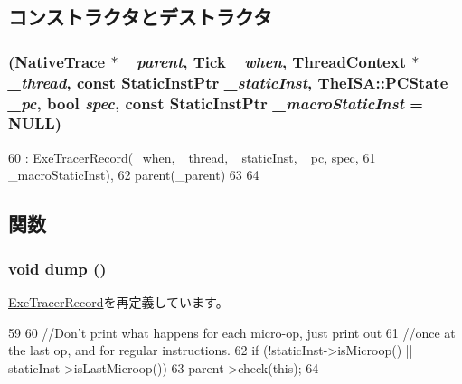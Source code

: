 \subsection{コンストラクタとデストラクタ}
\hypertarget{classTrace_1_1NativeTraceRecord_a93fa63c8fcf1be196cc993939b2c41ff}{
\subsubsection[{NativeTraceRecord}]{ ({\bf NativeTrace} $\ast$ {\em \_\-parent}, \/  {\bf Tick} {\em \_\-when}, \/  {\bf ThreadContext} $\ast$ {\em \_\-thread}, \/  const {\bf StaticInstPtr} {\em \_\-staticInst}, \/  TheISA::PCState {\em \_\-pc}, \/  bool {\em spec}, \/  const {\bf StaticInstPtr} {\em \_\-macroStaticInst} = {\ttfamily NULL})}}
\label{classTrace_1_1NativeTraceRecord_a93fa63c8fcf1be196cc993939b2c41ff}



\begin{DoxyCode}
60         : ExeTracerRecord(_when, _thread, _staticInst, _pc, spec,
61                 _macroStaticInst),
62         parent(_parent)
63     {
64     }
\end{DoxyCode}


\subsection{関数}
\hypertarget{classTrace_1_1NativeTraceRecord_accd2600060dbaee3a3b41aed4034c63c}{
\subsubsection[{dump}]{\setlength{\rightskip}{0pt plus 5cm}void dump ()}}
\label{classTrace_1_1NativeTraceRecord_accd2600060dbaee3a3b41aed4034c63c}


\hyperlink{classTrace_1_1ExeTracerRecord_accd2600060dbaee3a3b41aed4034c63c}{ExeTracerRecord}を再定義しています。


\begin{DoxyCode}
59 {
60     //Don't print what happens for each micro-op, just print out
61     //once at the last op, and for regular instructions.
62     if (!staticInst->isMicroop() || staticInst->isLastMicroop())
63         parent->check(this);
64 }
\end{DoxyCode}


